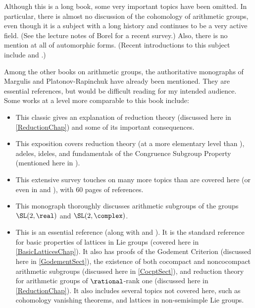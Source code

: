 Although this is a long book, some very important topics have been omitted. In particular, there is almost no discussion of the cohomology of arithmetic groups, even though it is a subject with a long history and continues to be a very active field. (See the lecture notes of Borel \cite{Borel-IntroCoho} for a recent survey.)
Also, there is no mention at all of automorphic forms. (Recent introductions to this subject include \cite{Deitmar-AutoForms} and \cite{PCMI-AutoForms}.)

Among the other books on arithmetic groups, the authoritative monographs of Margulis \cite{MargulisBook} and Platonov-Rapinchuk \cite{PlatonovRapinchukBook} have already been mentioned. They are essential references, but would be difficult reading for my intended audience. 
Some works at a level more comparable to this book include:
	\begin{itemize} \itemsep=\medskipamount
	\medskip

	\item[\cite{Borel-IntroGrpArith}] This classic gives an explanation of reduction theory (discussed here in \cref{ReductionChap}) and some of its important consequences.
	
	\item[\cite{Humphreys-ArithGrps}] This exposition covers reduction theory (at a more elementary level than \cite{Borel-IntroGrpArith}), adeles, ideles, and fundamentals of the Congruence Subgroup Property (mentioned here in ).
	
	\item[\cite{Ji-ArithGrpsWhatWhyHow}] This extensive survey touches on many more topics than are covered here (or even in \cite{MargulisBook} and \cite{PlatonovRapinchukBook}), with 60 pages of references.

	\item[\cite{MaclachlanReid-ArithHyp3Mflds}] This monograph thoroughly discusses arithmetic subgroups of the groups $\SL(2,\real)$ and $\SL(2,\complex)$.

	\item[\cite{RaghunathanBook}] This is an essential reference (along with \cite{MargulisBook} and \cite{PlatonovRapinchukBook}). It is the standard reference for basic properties of lattices in Lie groups (covered here in \cref{BasicLatticesChap}). It also has proofs of the Godement Criterion (discussed here in \cref{GodementSect}), the existence of both cocompact and noncocompact arithmetic subgroups (discussed here in \cref{CocptSect}), and reduction theory for arithmetic groups of $\rational$-rank one (discussed here in \cref{ReductionChap}). It also includes several topics not covered here, such as cohomology vanishing theorems, and lattices in non-semisimple Lie groups.


\end{itemize}
